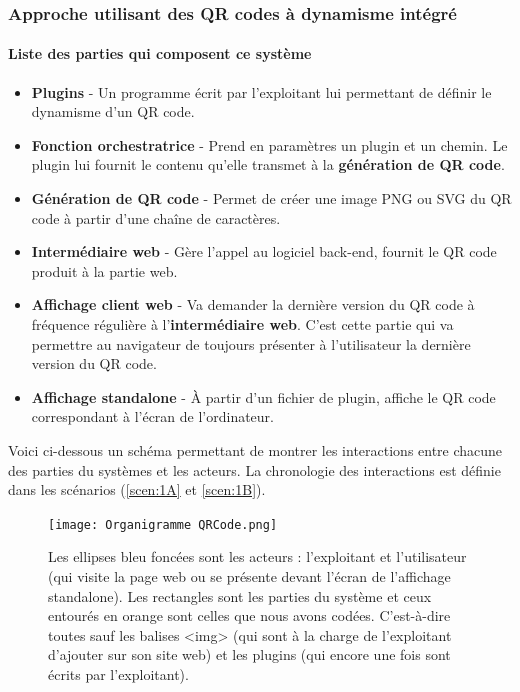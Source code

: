 \documentclass[a4paper,12pt]{article}
\begin{document}
\subsubsection{Approche utilisant des QR codes à dynamisme intégré}

\paragraph{Liste des parties qui composent ce système}
    \begin{itemize}
  \item \textbf{Plugins} - Un programme écrit par l'exploitant lui permettant de définir le dynamisme d'un QR code.\\
  
  \item \textbf{Fonction orchestratrice} - Prend en paramètres un plugin et un chemin. Le plugin lui fournit le contenu qu'elle transmet à la \textbf{génération de QR code}.\\
  
  \item \textbf{Génération de QR code} - Permet de créer une image PNG ou SVG du QR code à partir d'une chaîne de caractères.\\
  
  \item \textbf{Intermédiaire web} - Gère l'appel au logiciel back-end, fournit le QR code produit à la partie web.\\
  
  \item \textbf{Affichage client web} - Va demander la dernière version du QR code à fréquence régulière à l'\textbf{intermédiaire web}. C'est cette partie qui va permettre au navigateur de toujours présenter à l'utilisateur la dernière version du QR code.\\
  
  \item \textbf{Affichage standalone} - À partir d'un fichier de plugin, affiche le QR code correspondant à l'écran de l'ordinateur.\\

\end{itemize}
\noindent
Voici ci-dessous un schéma permettant de montrer les interactions entre chacune des parties du systèmes et les acteurs. La chronologie des interactions est définie dans les scénarios (\ref{scen:1A} et \ref{scen:1B}).

\begin{figure}[H]
\begin{center}
  \texttt{[image: Organigramme QRCode.png]}
  \caption{Les ellipses bleu foncées sont les acteurs : l'exploitant et l'utilisateur (qui visite la page web ou se présente devant l'écran de l'affichage standalone). Les rectangles sont les parties du système et ceux entourés en orange sont celles que nous avons codées. C'est-à-dire toutes sauf les balises <img> (qui sont à la charge de l'exploitant d'ajouter sur son site web) et les plugins (qui encore une fois sont écrits par l'exploitant).}
\end{center}
\end{figure}
\end{document}
